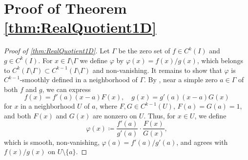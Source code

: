 \documentclass{article}
\theoremstyle{theorem}
\newtheorem{lemma}{Lemma}
\theoremstyle{definition}
\def\CC{\mathbb{C}}
\def\FF{\mathbb{F}}
\def\RR{\mathbb{R}}
\begin{document}
\section{Proof of Theorem \ref{thm:RealQuotient1D}}
\label{app:ProofOfRealQuotient1D}



\begin{proof}[Proof of \autoref{thm:RealQuotient1D}]
    Let \(\Gamma\) be the zero set of \(f\in C^k(I)\) and \(g\in C^k(I)\).  For \(x\in I\setminus\Gamma\) we define \(\varphi\) by \(\varphi(x) = f(x)/g(x)\), which belongs to \(C^{k}(I\setminus\Gamma)\subset C^{k-1}(I\setminus\Gamma)\) and non-vanishing.  It remains to show that \(\varphi\) is \(C^{k-1}\)-smoothly defined in a neighborhood of \(\Gamma\).  
    By , near a simple zero \(a \in \Gamma\) of both \(f\) and \(g\), we can express  
\[
f(x) = f'(a)(x-a)F(x), \quad g(x) = g'(a)(x-a)G(x)
\]
for \(x\) in a neighborhood \(U\) of \(a\), where \(F,G\in C^{k-1}(U)\), \(F(a) = G(a) = 1\), and both \(F(x)\) and \(G(x)\) are nonzero on \(U\). 
Thus, for \(x \in U\), we define  
\[
\varphi(x) \coloneqq \frac{f'(a)}{g'(a)} \cdot \frac{F(x)}{G(x)},
\]
which is smooth, non-vanishing,  $\varphi(a)=f'(a)/g'(a)$, and agrees with \(f(x)/g(x)\) on \(U\setminus\{a\}\).  
\end{proof}
\end{document}
